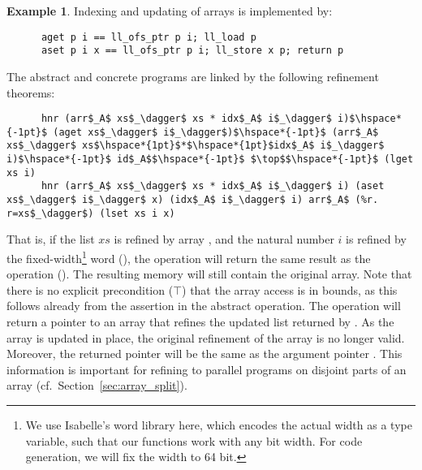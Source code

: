 \documentclass[sn-mathphys,Numbered]{sn-jnl}
\theoremstyle{thmstyleone}%
\theoremstyle{definition}%
\newtheorem{example}{Example}%
\theoremstyle{thmstylethree}%
\begin{document}
\begin{example}
    Indexing and updating of arrays is implemented by:
    \begin{lstlisting}
      aget p i == ll_ofs_ptr p i; ll_load p
      aset p i x == ll_ofs_ptr p i; ll_store x p; return p
    \end{lstlisting}
    The abstract and concrete programs are linked by the following refinement theorems:
    \begin{lstlisting}
      hnr (arr$_A$ xs$_\dagger$ xs * idx$_A$ i$_\dagger$ i)$\hspace*{-1pt}$ (aget xs$_\dagger$ i$_\dagger$)$\hspace*{-1pt}$ (arr$_A$ xs$_\dagger$ xs$\hspace*{1pt}$*$\hspace*{1pt}$idx$_A$ i$_\dagger$ i)$\hspace*{-1pt}$ id$_A$$\hspace*{-1pt}$ $\top$$\hspace*{-1pt}$ (lget xs i)
      hnr (arr$_A$ xs$_\dagger$ xs * idx$_A$ i$_\dagger$ i) (aset xs$_\dagger$ i$_\dagger$ x) (idx$_A$ i$_\dagger$ i) arr$_A$ (%r. r=xs$_\dagger$) (lset xs i x)
    \end{lstlisting}
    That is, if the list \is$xs$ is refined by array , and the natural number \is$i$ is refined
    by the fixed-width\footnote{We use Isabelle's word library here, which encodes the actual width as a type variable,
    such that our functions work with any bit width. For code generation, we will fix the width to 64 bit.} word  (),
    the  operation will return the same result as the  operation ().
    The resulting memory will still contain the original array. Note that there is no explicit precondition ($\top$) that the array access
    is in bounds, as this follows already from the assertion in the abstract  operation.
    The  operation will return a pointer to an array that refines the updated list returned by .
    As the array is updated in place, the original refinement of the array is no longer valid.
    Moreover, the returned pointer  will be the same as the argument pointer .
    This information is important for refining to parallel programs on disjoint parts of an
    array (cf.\ Section~\ref{sec:array_split}).


\end{example}
\end{document}
